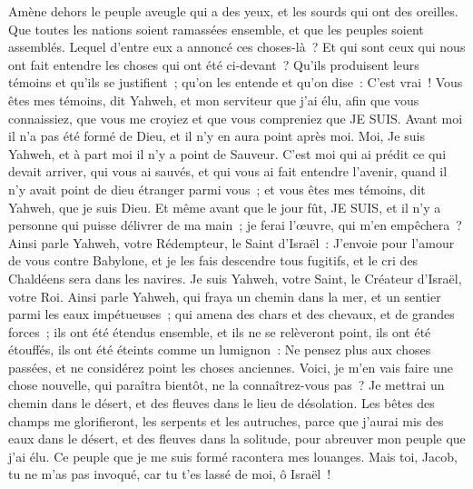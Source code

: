 \begin{multicols}{2}
Amène dehors le peuple aveugle qui a des yeux, et les sourds qui ont des oreilles.
Que toutes les nations soient ramassées ensemble, et que les peuples soient assemblés. Lequel d'entre eux a annoncé ces choses-là~? Et qui sont ceux qui nous ont fait entendre les choses qui ont été ci-devant~? Qu'ils produisent leurs témoins et qu'ils se justifient~; qu'on les entende et qu'on dise~: C'est vrai~!
Vous êtes mes témoins, dit Yahweh, et mon serviteur que j'ai élu, afin que vous connaissiez, que vous me croyiez et que vous compreniez que JE SUIS. Avant moi il n'a pas été formé de Dieu, et il n'y en aura point après moi.
Moi, Je suis Yahweh, et à part moi il n'y a point de Sauveur.
C'est moi qui ai prédit ce qui devait arriver, qui vous ai sauvés, et qui vous ai fait entendre l'avenir, quand il n'y avait point de dieu étranger parmi vous~; et vous êtes mes témoins, dit Yahweh, que je suis Dieu.
Et même avant que le jour fût, JE SUIS, et il n'y a personne qui puisse délivrer de ma main~; je ferai l'œuvre, qui m'en empêchera~?
Ainsi parle Yahweh, votre Rédempteur, le Saint d'Israël~: J'envoie pour l'amour de vous contre Babylone, et je les fais descendre tous fugitifs, et le cri des Chaldéens sera dans les navires.
Je suis Yahweh, votre Saint, le Créateur d'Israël, votre Roi.
Ainsi parle Yahweh, qui fraya un chemin dans la mer, et un sentier parmi les eaux impétueuses~;
qui amena des chars et des chevaux, et de grandes forces~; ils ont été étendus ensemble, et ils ne se relèveront point, ils ont été étouffés, ils ont été éteints comme un lumignon~:
Ne pensez plus aux choses passées, et ne considérez point les choses anciennes.
Voici, je m'en vais faire une chose nouvelle, qui paraîtra bientôt, ne la connaîtrez-vous pas~? Je mettrai un chemin dans le désert, et des fleuves dans le lieu de désolation.
Les bêtes des champs me glorifieront, les serpents et les autruches, parce que j'aurai mis des eaux dans le désert, et des fleuves dans la solitude, pour abreuver mon peuple que j'ai élu.
Ce peuple que je me suis formé racontera mes louanges.
Mais toi, Jacob, tu ne m'as pas invoqué, car tu t'es lassé de moi, ô Israël~!

\end{multicols}
